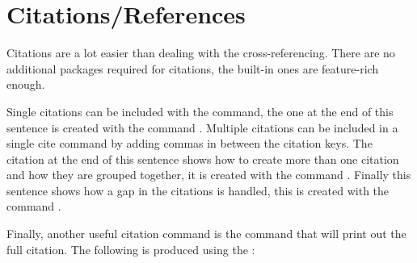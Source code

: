 	\section{Citations/References}
		Citations are a lot easier than dealing with the cross-referencing.
		There are no additional packages required for citations, the built-in ones are feature-rich enough.

		Single citations can be included with the  command, the one at the end of this sentence is created with the  command \cite{TEST}. 
		Multiple citations can be included in a single cite command by adding commas in between the citation keys. 
		The citation at the end of this sentence shows how to create more than one citation and how they are grouped together, it is created with the  command \cite{testone,cite2,cite3,cite4,cite5}.
		Finally this sentence shows how a gap in the citations is handled, this is created with the  command \cite{testone,cite2,cite3,cite5}.

		Finally, another useful citation command is the  command that will print out the full citation. The following is produced using the :

